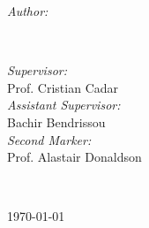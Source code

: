 \begin{titlepage}
\begin{minipage}{0.4\textwidth}
\begin{flushleft} \large
\emph{Author:}\\
\@author %
\end{flushleft}
\end{minipage}
~
\begin{minipage}{0.4\textwidth}
\begin{flushright} \large
\emph{Supervisor:} \\
Prof. Cristian Cadar \\[1.2em]
\emph{Assistant Supervisor:} \\
Bachir Bendrissou \\[1.2em]
\emph{Second Marker:} \\
Prof. Alastair Donaldson
\end{flushright}
\end{minipage}\\[2cm]
\makeatother



{\large \today}\\[2cm] %

\vfill %

\end{titlepage}